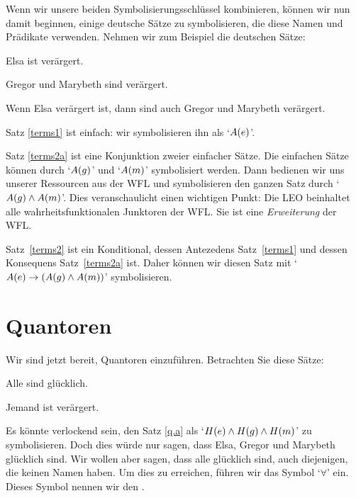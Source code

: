 
Wenn wir unsere beiden Symbolisierungsschlüssel kombinieren, können wir nun damit beginnen, einige deutsche Sätze zu symbolisieren, die diese Namen und Prädikate verwenden. Nehmen wir zum Beispiel die deutschen Sätze:
	\begin{earg}
		\item[\ex{terms1}] Elsa ist verärgert.
		\item[\ex{terms2a}] Gregor und Marybeth sind verärgert.
		\item[\ex{terms2}] Wenn Elsa verärgert ist, dann sind auch Gregor und Marybeth verärgert.
	\end{earg}
Satz \ref{terms1} ist einfach: wir symbolisieren ihn als `$\mathord{A}(e)$'.

Satz \ref{terms2a} ist eine Konjunktion zweier einfacher Sätze. Die einfachen Sätze können durch `$\mathord{A}(g)$' und `$\mathord{A}(m)$' symbolisiert werden. Dann bedienen wir uns unserer Ressourcen aus der WFL und symbolisieren den ganzen Satz durch `$\mathord{A}(g) \wedge \mathord{A}(m)$'. Dies veranschaulicht einen wichtigen Punkt: Die LEO beinhaltet alle wahrheitsfunktionalen Junktoren der WFL. Sie ist eine \emph{Erweiterung} der WFL. 

Satz~\ref{terms2} ist ein Konditional, dessen Antezedens Satz~\ref{terms1} und dessen Konsequens Satz~\ref{terms2a} ist. Daher können wir diesen Satz mit `$\mathord{A}(e) \rightarrow (\mathord{A}(g) \wedge \mathord{A}(m))$' symbolisieren.

\section{Quantoren}
Wir sind jetzt bereit, Quantoren einzuführen. Betrachten Sie diese Sätze:
	\begin{earg}
		\item[\ex{q.a}] Alle sind glücklich.
		\item[\ex{q.e}] Jemand ist verärgert.
	\end{earg}
Es könnte verlockend sein, den Satz \ref{q.a} als `$\mathord{H}(e) \wedge \mathord{H}(g) \wedge \mathord{H}(m)$' zu symbolisieren. Doch dies würde nur sagen, dass Elsa, Gregor und Marybeth glücklich sind. Wir wollen aber sagen, dass alle glücklich sind, auch diejenigen, die keinen Namen haben. Um dies zu erreichen, führen wir das Symbol `$\forall$' ein. Dieses Symbol nennen wir den .

